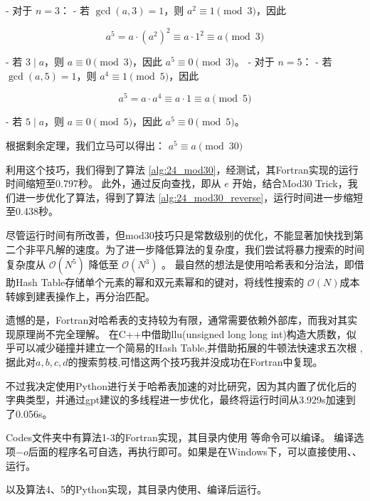 - 对于 \(n = 3\)：
- 若 \(\gcd(a, 3) = 1\)，则 \(a^2 \equiv 1 \pmod{3}\)，因此

\[
    a^5 = a \cdot (a^2)^2 \equiv a \cdot 1^2 \equiv a \pmod{3}
\]

- 若 \(3 \mid a\)，则 \(a \equiv 0 \pmod{3}\)，因此 \(a^5 \equiv 0 \pmod{3}\)。
- 对于 \(n = 5\)：
- 若 \(\gcd(a, 5) = 1\)，则 \(a^4 \equiv 1 \pmod{5}\)，因此

\[
    a^5 = a \cdot a^4 \equiv a \cdot 1 \equiv a \pmod{5}
\]

- 若 \(5 \mid a\)，则 \(a \equiv 0 \pmod{5}\)，因此 \(a^5 \equiv 0 \pmod{5}\)。

根据剩余定理，我们立马可以得出：
$a^5 \equiv a \pmod{30}$

利用这个技巧，我们得到了算法 \ref{alg:24_mod30}，经测试，其Fortran实现的运行时间缩短至0.797秒。
此外，通过反向查找，即从 \(e\) 开始，结合Mod30 Trick，我们进一步优化了算法，得到了算法 \ref{alg:24_mod30_reverse}，运行时间进一步缩短至0.438秒。

尽管运行时间有所改善，但mod30技巧只是常数级别的优化，不能显著加快找到第二个非平凡解的速度。为了进一步降低算法的复杂度，我们尝试将暴力搜索的时间复杂度从 \(\mathcal{O}(N^5)\) 降低至 \(\mathcal{O}(N^3)\) 。
最自然的想法是使用哈希表和分治法，即借助Hash Table存储单个元素的幂和双元素幂和的键对，将线性搜索的 \(\mathcal{O}(N)\)成本转嫁到建表操作上，再分治匹配。

遗憾的是，Fortran对哈希表的支持较为有限，通常需要依赖外部库，而我对其实现原理尚不完全理解。
在C++中借助llu(unsigned long long int)构造大质数，似乎可以减少碰撞并建立一个简易的Hash Table,并借助拓展的牛顿法快速求五次根
,据此对$a,b,c,d$的搜索剪枝,可惜这两个技巧我并没成功在Fortran中复现。

不过我决定使用Python进行关于哈希表加速的对比研究，因为其内置了优化后的字典类型，并通过gpt建议的多线程进一步优化，最终将运行时间从3.929s加速到了0.056s。

Codes文件夹中有算法1-3的Fortran实现，其目录内使用
等命令可以编译。
编译选项$-o$后面的程序名可自选，再执行即可。如果是在Windows下，可以直接使用、、运行。

以及算法4、5的Python实现，其目录内使用、编译后运行。
\newpage
